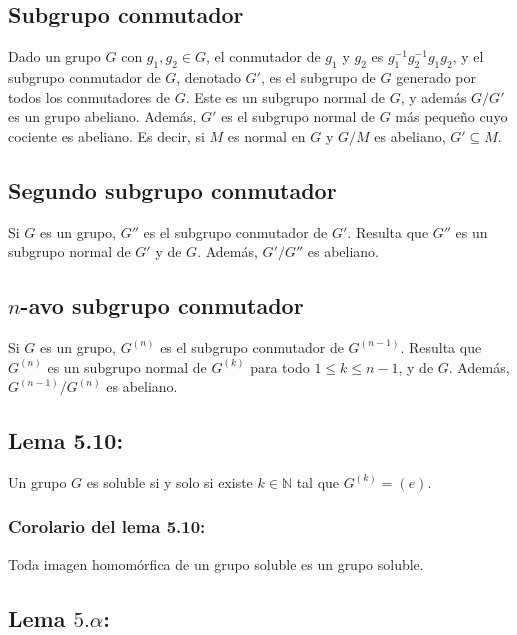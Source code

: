 \documentclass{article}
\begin{document}
\subsection*{\color{violet} Subgrupo conmutador}

Dado un grupo $G$ con $g_1,g_2\in G$, el conmutador de $g_1$ y $g_2$ es $g_1^{-1}g_2^{-1}g_1g_2$, y el subgrupo conmutador de $G$, denotado $G'$, es el subgrupo de $G$ generado por todos los conmutadores de $G$. Este es un subgrupo normal de $G$, y además $G/G'$ es un grupo abeliano. Además, $G'$ es el subgrupo normal de $G$ más pequeño cuyo cociente es abeliano. Es decir, si $M$ es normal en $G$ y $G/M$ es abeliano, $G'\subseteq M$.

\subsection*{\color{violet} Segundo subgrupo conmutador}

Si $G$ es un grupo, $G''$ es el subgrupo conmutador de $G'$. Resulta que $G''$ es un subgrupo normal de $G'$ y de $G$. Además, $G'/G''$ es abeliano.

\subsection*{\color{violet} $n$-avo subgrupo conmutador}

Si $G$ es un grupo, $G^{(n)}$ es el subgrupo conmutador de $G^{(n-1)}$. Resulta que $G^{(n)}$ es un subgrupo normal de $G^{(k)}$ para todo $1\leq k\leq n-1$, y de $G$. Además, $G^{(n-1)}/G^{(n)}$ es abeliano.

\subsection*{\color{blue} Lema 5.10:}

Un grupo $G$ es soluble si y solo si existe $k\in\mathbb{N}$ tal que $G^{(k)}=(e)$.

\subsubsection*{\color{blue} Corolario del lema 5.10:}

Toda imagen homomórfica de un grupo soluble es un grupo soluble.

\subsection*{\color{blue} Lema $5.\alpha$:}
\end{document}
